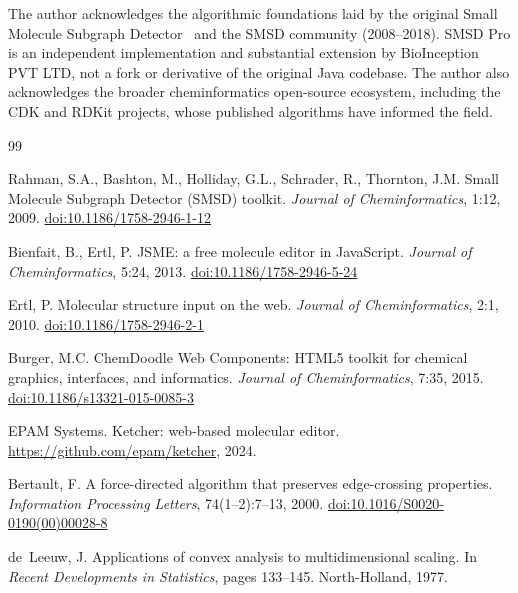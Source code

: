 \documentclass[twocolumn]{article}
\begin{document}
The author acknowledges the algorithmic foundations laid by the original
Small Molecule Subgraph Detector~\citep{Rahman2009} and the SMSD
community (2008--2018).  SMSD Pro is an independent implementation and
substantial extension by BioInception PVT LTD, not a fork or derivative
of the original Java codebase.  The author also acknowledges the
broader cheminformatics open-source ecosystem, including the CDK and
RDKit projects, whose published algorithms have informed the field.

\begin{thebibliography}{99}

Rahman, S.A., Bashton, M., Holliday, G.L., Schrader, R., Thornton, J.M.
\newblock Small Molecule Subgraph Detector (SMSD) toolkit.
\newblock \emph{Journal of Cheminformatics}, 1:12, 2009.
\newblock \href{https://doi.org/10.1186/1758-2946-1-12}{doi:10.1186/1758-2946-1-12}

Bienfait, B., Ertl, P.
\newblock JSME: a free molecule editor in JavaScript.
\newblock \emph{Journal of Cheminformatics}, 5:24, 2013.
\newblock \href{https://doi.org/10.1186/1758-2946-5-24}{doi:10.1186/1758-2946-5-24}

Ertl, P.
\newblock Molecular structure input on the web.
\newblock \emph{Journal of Cheminformatics}, 2:1, 2010.
\newblock \href{https://doi.org/10.1186/1758-2946-2-1}{doi:10.1186/1758-2946-2-1}

Burger, M.C.
\newblock ChemDoodle Web Components: HTML5 toolkit for chemical graphics,
  interfaces, and informatics.
\newblock \emph{Journal of Cheminformatics}, 7:35, 2015.
\newblock \href{https://doi.org/10.1186/s13321-015-0085-3}{doi:10.1186/s13321-015-0085-3}

EPAM Systems.
\newblock Ketcher: web-based molecular editor.
\newblock \url{https://github.com/epam/ketcher}, 2024.

Bertault, F.
\newblock A force-directed algorithm that preserves edge-crossing properties.
\newblock \emph{Information Processing Letters}, 74(1--2):7--13, 2000.
\newblock \href{https://doi.org/10.1016/S0020-0190(00)00028-8}{doi:10.1016/S0020-0190(00)00028-8}

de~Leeuw, J.
\newblock Applications of convex analysis to multidimensional scaling.
\newblock In \emph{Recent Developments in Statistics}, pages 133--145.
  North-Holland, 1977.


\end{thebibliography}
\end{document}
